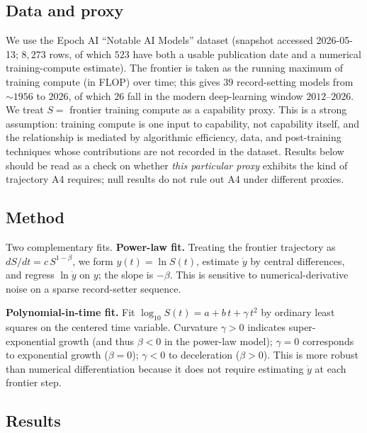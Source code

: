 \documentclass[11pt,letterpaper]{article}
\theoremstyle{plain}
\theoremstyle{definition}
\theoremstyle{remark}
\begin{document}
\subsection{Data and proxy}

We use the Epoch AI ``Notable AI Models'' dataset (snapshot accessed
2026-05-13; $8{,}273$ rows, of which $523$ have both a usable
publication date and a numerical training-compute estimate).
The frontier is taken as the running maximum of training compute
(in FLOP) over time; this gives $39$ record-setting models from
$\sim\!1956$ to $2026$, of which $26$ fall in the modern deep-learning
window $2012$--$2026$.
We treat $S = $ frontier training compute as a capability proxy.
This is a strong assumption: training compute is one input to capability,
not capability itself, and the relationship is mediated by algorithmic
efficiency, data, and post-training techniques whose contributions are
not recorded in the dataset.
Results below should be read as a check on whether \emph{this particular
proxy} exhibits the kind of trajectory A4 requires; null results do not
rule out A4 under different proxies.

\subsection{Method}

Two complementary fits.
\textbf{Power-law fit.}
Treating the frontier trajectory as $dS/dt = c\,S^{1-\beta}$, we form
$y(t) = \ln S(t)$, estimate $\dot{y}$ by central differences, and
regress $\ln \dot{y}$ on $y$; the slope is $-\beta$.
This is sensitive to numerical-derivative noise on a sparse
record-setter sequence.

\textbf{Polynomial-in-time fit.}
Fit $\log_{10} S(t) = a + b\,t + \gamma\,t^{2}$ by ordinary least
squares on the centered time variable.
Curvature $\gamma > 0$ indicates super-exponential growth (and thus
$\beta < 0$ in the power-law model); $\gamma = 0$ corresponds to
exponential growth ($\beta = 0$); $\gamma < 0$ to deceleration
($\beta > 0$).
This is more robust than numerical differentiation because it does
not require estimating $\dot{y}$ at each frontier step.

\subsection{Results}
\end{document}
